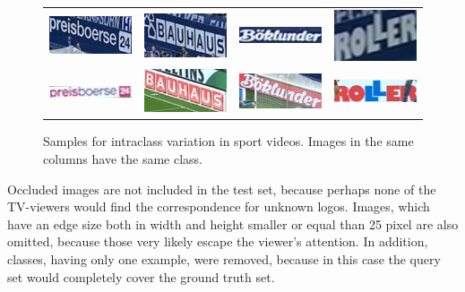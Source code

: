 \begin{figure}
  \centering
    \begin{tabular}{cccc}
      \includegraphics[width=25mm]{images/mt/largevar_1_b.jpg} &   \includegraphics[width=25mm]{images/mt/largevar_2_a.jpg}  & \includegraphics[width=25mm]{images/mt/largevar_3_a.jpg} &   \includegraphics[width=25mm]{images/mt/largevar_4_a.jpg} \\
      \includegraphics[width=25mm]{images/mt/largevar_1_a.jpg} &   \includegraphics[width=25mm]{images/mt/largevar_2_b.jpg}  & \includegraphics[width=25mm]{images/mt/largevar_3_b.jpg} &   \includegraphics[width=25mm]{images/mt/largevar_4_b.jpg}
    \end{tabular}
  \caption{Samples for intraclass variation in sport videos. Images in the same columns have the same class.}
  \label{f:largevar}
\end{figure}
Occluded images are not included in the test set, because perhaps none of the TV-viewers would find the correspondence for unknown logos. Images, which have an edge size both in width and height smaller or equal than 25 pixel are also omitted, because those very likely escape the viewer's attention. In addition, classes, having only one example, were removed, because in this case the query set would completely cover the ground truth set.

